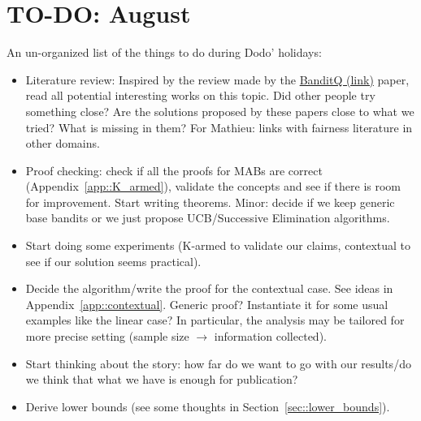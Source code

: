 \section{TO-DO: August}

An un-organized list of the things to do during Dodo' holidays:

\begin{itemize}
	\item Literature review: Inspired by the review made by the \href{https://arxiv.org/pdf/2304.05219.pdf}{BanditQ (link)} paper, read all potential interesting works on this topic. Did other people try something close? Are the solutions proposed by these papers close to what we tried? What is missing in them? For Mathieu: links with fairness literature in other domains.
	\item Proof checking: check if all the proofs for MABs are correct (Appendix~\ref{app::K_armed}), validate the concepts and see if there is room for improvement. Start writing theorems. Minor: decide if we keep generic base bandits or we just propose UCB/Successive Elimination algorithms.
	\item Start doing some experiments (K-armed to validate our claims, contextual to see if our solution seems practical).
	\item Decide the algorithm/write the proof for the contextual case. See ideas in Appendix~\ref{app::contextual}. Generic proof? Instantiate it for some usual examples like the linear case? In particular, the analysis may be tailored for more precise setting (sample size $\to$ information collected).
	\item Start thinking about the story: how far do we want to go with our results/do we think that what we have is enough for publication?
	\item Derive lower bounds (see some thoughts in Section~\ref{sec::lower_bounds}).
\end{itemize}